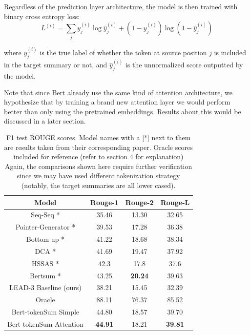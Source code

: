 \documentclass[11pt,a4paper]{article}
\begin{document}
Regardless of the prediction layer architecture, the model is then trained with binary cross entropy loss:
\begin{equation*}
	L^{(i)} = \sum_j y^{(i)}_j \log\hat{y}^{(i)}_j + (1-y^{(i)}_j)\log(1-\hat{y}^{(i)}_j)
\end{equation*}

where $y^{(i)}_j$ is the true label of whether the token at source position $j$ is included in the target summary or not, and $\hat{y}^{(i)}_j$ is the unnormalized score outputted by the model.

Note that since Bert already use the same kind of attention architecture, we hypothesize that by training a brand new attention layer we would perform better than only using the pretrained embeddings. Results about this would be discussed in a later section.

\begin{table}[t!]
	\centering
	\begin{tabular}{c|ccc}
		Model                & Rouge-1 & Rouge-2 & Rouge-L \\ \hline
		Seq-Seq \cite{lead}*              & 35.46   & 13.30   & 32.65   \\
		Pointer-Generator \cite{pointer-generator}*    & 39.53   & 17.28   & 36.38   \\
		Bottom-up \cite{bottom-up}*            & 41.22   & 18.68   & 38.34   \\
		DCA \cite{dca}*                  & 41.69   & 19.47   & 37.92   \\
		HSSAS \cite{al2018hierarchical}*                & 42.3    & 17.8    & 37.6    \\
		Bertsum \cite{bert-sum}*              & 43.25   & \textbf{20.24}   & 39.63   \\ \hline
		LEAD-3 Baseline (ours) & 38.21 & 15.45 & 32.39 \\
		Oracle				& 88.11 & 76.37 & 85.52 \\
		Bert-tokenSum Simple    & 44.80   & 18.57   & 39.70   \\
		Bert-tokenSum Attention & \textbf{44.91}   & 18.21   & \textbf{39.81 }
	\end{tabular}
	\caption{F1 test ROUGE scores. Model names with a [*] next to them are results taken from their corresponding paper. Oracle scores included for reference (refer to section 4 for explanation) Again, the comparisons shown here require further verification since we may have used different tokenization strategy (notably, the target summaries are all lower cased).}
	\label{table:results}
\end{table}
\end{document}
